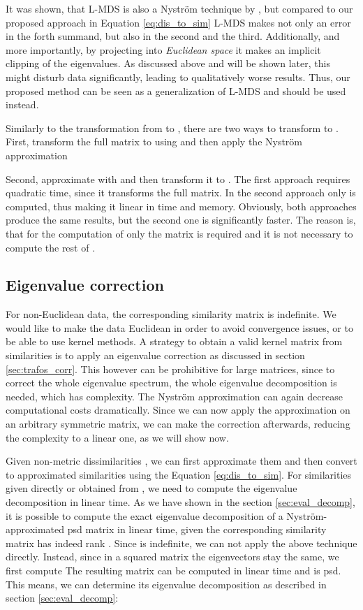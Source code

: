 \documentclass[twoside,11pt]{article}
\begin{document}
It was shown, that L-MDS is also a Nystr\"om technique by \cite{Platt:2005},
but compared to our proposed approach in Equation \eqref{eq:dis_to_sim}
L-MDS makes not only an error in the forth summand, but also in the second and the third.
Additionally, and more importantly, by projecting into \emph{Euclidean space}
it makes an implicit clipping of the eigenvalues. 
As discussed above and will be shown later,
this might disturb data significantly, leading to qualitatively worse results.
Thus, our proposed method can be seen as a generalization of L-MDS
and should be used instead.

Similarly to the transformation from  to ,
there are two ways to transform  to .
First, transform the full matrix  to 
using 
and then apply the Nystr\"om approximation

Second, approximate  with 
and then transform it to .
The first approach requires quadratic time,
since it transforms the full matrix.
In the second approach only  is computed,
thus making it linear in time and memory.
Obviously, both approaches produce the same results,
but the second one is significantly faster.
The reason is, that for the computation of 
only the matrix  is required
and it is not necessary to compute the rest of .

\subsection{Eigenvalue correction}
For non-Euclidean data,
the corresponding similarity matrix is indefinite.
We would like to make the data Euclidean
in order to avoid convergence issues,
or to be able to use kernel methods.
A strategy to obtain a valid kernel matrix from similarities
is to apply an eigenvalue correction as discussed in section \ref{sec:trafos_corr}. 
This however can be prohibitive for large matrices, since to correct the whole
eigenvalue spectrum, the whole eigenvalue decomposition is needed,
which has  complexity.
The Nystr\"om approximation can again decrease computational costs dramatically.
Since we can now apply the approximation on an arbitrary symmetric matrix,
we can make the correction afterwards,
reducing the complexity to a linear one, as we will show now.

Given non-metric dissimilarities ,
we can first approximate them and then convert to approximated similarities 
using the Equation \eqref{eq:dis_to_sim}.
For similarities 
given directly or obtained from ,
we need to compute the eigenvalue decomposition in linear time.
As we have shown in the section \ref{sec:eval_decomp},
it is possible to compute the exact eigenvalue decomposition
of a Nystr\"om-approximated psd matrix in linear time, given
the corresponding similarity matrix has indeed rank .
Since  is indefinite,
we can not apply the above technique directly.
Instead, since in a squared matrix the eigenvectors stay the same,
we first compute 
The resulting matrix can be computed in linear time and is psd.
This means, we can determine its eigenvalue decomposition
as described in section \ref{sec:eval_decomp}:
\end{document}

